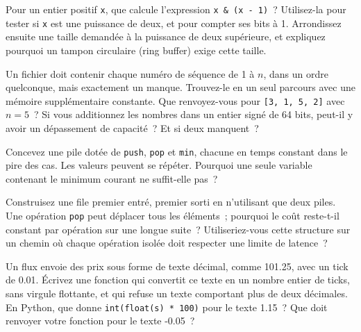 \begin{question}\label{iq:iv3:algorithms:9}
Pour un entier positif \texttt{x}, que calcule l'expression \texttt{x \& (x - 1)}~? Utilisez-la pour tester si \texttt{x} est une puissance de deux, et pour compter ses bits à 1. Arrondissez ensuite une taille demandée à la puissance de deux supérieure, et expliquez pourquoi un tampon circulaire (ring buffer) exige cette taille.
\end{question}

\begin{question}\label{iq:iv3:algorithms:10}
Un fichier doit contenir chaque numéro de séquence de 1 à $n$, dans un ordre quelconque, mais exactement un manque. Trouvez-le en un seul parcours avec une mémoire supplémentaire constante. Que renvoyez-vous pour \texttt{[3, 1, 5, 2]} avec $n = 5$~? Si vous additionnez les nombres dans un entier signé de 64 bits, peut-il y avoir un dépassement de capacité~? Et si deux manquent~?
\end{question}

\begin{question}\label{iq:iv3:algorithms:11}
Concevez une pile dotée de \texttt{push}, \texttt{pop} et \texttt{min}, chacune en temps constant dans le pire des cas. Les valeurs peuvent se répéter. Pourquoi une seule variable contenant le minimum courant ne suffit-elle pas~?
\end{question}

\begin{question}\label{iq:iv3:algorithms:12}
Construisez une file premier entré, premier sorti en n'utilisant que deux piles. Une opération \texttt{pop} peut déplacer tous les éléments~; pourquoi le coût reste-t-il constant par opération sur une longue suite~? Utiliseriez-vous cette structure sur un chemin où chaque opération isolée doit respecter une limite de latence~?
\end{question}

\begin{question}\label{iq:iv3:algorithms:13}
Un flux envoie des prix sous forme de texte décimal, comme 101.25, avec un tick de 0.01. Écrivez une fonction qui convertit ce texte en un nombre entier de ticks, sans virgule flottante, et qui refuse un texte comportant plus de deux décimales. En Python, que donne \texttt{int(float(s) * 100)} pour le texte 1.15~? Que doit renvoyer votre fonction pour le texte -0.05~?
\end{question}

